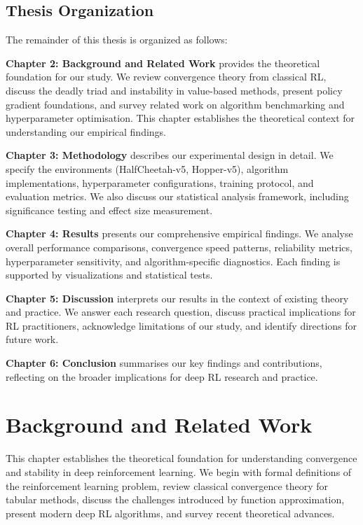 \documentclass[12pt,a4paper]{report}
\begin{document}
\section{Thesis Organization}

The remainder of this thesis is organized as follows:

\textbf{Chapter 2: Background and Related Work} provides the theoretical foundation for our study. We review convergence theory from classical RL, discuss the deadly triad and instability in value-based methods, present policy gradient foundations, and survey related work on algorithm benchmarking and hyperparameter optimisation. This chapter establishes the theoretical context for understanding our empirical findings.

\textbf{Chapter 3: Methodology} describes our experimental design in detail. We specify the environments (HalfCheetah-v5, Hopper-v5), algorithm implementations, hyperparameter configurations, training protocol, and evaluation metrics. We also discuss our statistical analysis framework, including significance testing and effect size measurement.

\textbf{Chapter 4: Results} presents our comprehensive empirical findings. We analyse overall performance comparisons, convergence speed patterns, reliability metrics, hyperparameter sensitivity, and algorithm-specific diagnostics. Each finding is supported by visualizations and statistical tests.

\textbf{Chapter 5: Discussion} interprets our results in the context of existing theory and practice. We answer each research question, discuss practical implications for RL practitioners, acknowledge limitations of our study, and identify directions for future work.

\textbf{Chapter 6: Conclusion} summarises our key findings and contributions, reflecting on the broader implications for deep RL research and practice.

\chapter{Background and Related Work}

This chapter establishes the theoretical foundation for understanding convergence and stability in deep reinforcement learning. We begin with formal definitions of the reinforcement learning problem, review classical convergence theory for tabular methods, discuss the challenges introduced by function approximation, present modern deep RL algorithms, and survey recent theoretical advances.
\end{document}
